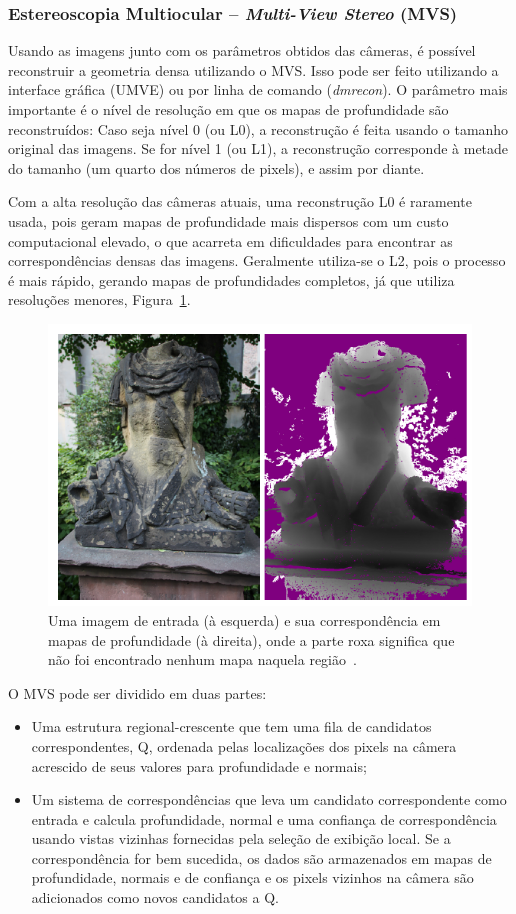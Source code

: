 \subsubsection*{Estereoscopia Multiocular -- \emph{Multi-View Stereo} (MVS)}

Usando as imagens junto com os parâmetros obtidos das câmeras, é possível
reconstruir a geometria densa utilizando o MVS. Isso pode ser feito utilizando a
interface gráfica (UMVE) ou por linha de comando (\emph{dmrecon}).
O parâmetro mais importante é o nível de resolução em que os mapas de
profundidade são reconstruídos: Caso seja nível 0 (ou L0), a reconstrução é
feita usando o tamanho original das imagens. Se for nível 1 (ou L1), a
reconstrução corresponde à metade do tamanho (um quarto dos números de pixels),
e assim por diante.

Com a alta resolução das câmeras atuais, uma reconstrução L0 é raramente usada, pois
geram mapas de profundidade mais dispersos com um custo computacional elevado, o
que acarreta em dificuldades para encontrar as correspondências densas das
imagens. Geralmente utiliza-se o L2, pois o processo é mais rápido, gerando
mapas de profundidades completos, já que utiliza resoluções menores, Figura~\ref{fig:mvedepth}.

\begin{figure}[!h]
	\centering
	\includegraphics[width=0.4\linewidth]{figs/mvedepth.png}
	\caption{%
  Uma imagem de entrada (à esquerda) e sua correspondência em mapas de
  profundidade (à direita), onde a parte roxa significa que não foi encontrado
  nenhum mapa naquela região~\protect\cite{mve}.
	}\label{fig:mvedepth}
\end{figure}

O MVS pode ser dividido em duas partes:
\begin{itemize}
\item {Uma estrutura regional-crescente que tem uma fila de candidatos correspondentes, Q, ordenada pelas localizações dos pixels na câmera acrescido de seus valores para profundidade e normais;}
\item {Um sistema de correspondências que leva um candidato correspondente como entrada e calcula profundidade, normal e uma confiança de correspondência usando vistas vizinhas fornecidas pela seleção de exibição local. Se a correspondência for bem sucedida, os dados são armazenados em mapas de profundidade, normais e de confiança e os pixels vizinhos na câmera são adicionados como novos candidatos a Q.}
\end{itemize}

